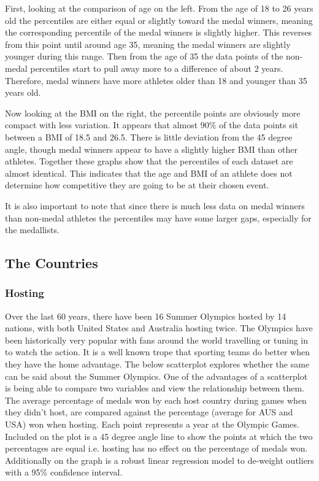 \documentclass[a4 paper, 12pt]{article}
\begin{document}
        First, looking at the comparison of age on the left. From the age of 18 to 26 years old the percentiles are either equal or slightly toward the medal winners, meaning the corresponding percentile of the medal winners is slightly higher. This reverses from this point until around age 35, meaning the medal winners are slightly younger during this range. Then from the age of 35 the data points of the non-medal percentiles start to pull away more to a difference of about 2 years. Therefore, medal winners have more athletes older than 18 and younger than 35 years old. 

        Now looking at the BMI on the right, the percentile points are obviously more compact with less variation. It appears that almost 90\% of the data points sit between a BMI of 18.5 and 26.5. There is little deviation from the 45 degree angle, though medal winners appear to have a slightly higher BMI than other athletes. Together these graphs show that the percentiles of each dataset are almost identical. This indicates that the age and BMI of an athlete does not determine how competitive they are going to be at their chosen event.

        It is also important to note that since there is much less data on medal winners than non-medal athletes the percentiles may have some larger gaps, especially for the medallists.
    
    \subsection{The Countries}

        \subsubsection{Hosting}
        Over the last 60 years, there have been 16 Summer Olympics hosted by 14 nations, with both United States and Australia hosting twice. The Olympics have been historically very popular with fans around the world travelling or tuning in to watch the action. It is a well known trope that sporting teams do better when they have the home advantage. The below scatterplot explores whether the same can be said about the Summer Olympics. One of the advantages of a scatterplot is being able to compare two variables and view the relationship between them. The average percentage of medals won by each host country during games when they didn't host, are compared against the percentage (average for AUS and USA) won when hosting. Each point represents a year at the Olympic Games. Included on the plot is a 45 degree angle line to show the points at which the two percentages are equal i.e. hosting has no effect on the percentage of medals won. Additionally on the graph is a robust linear regression model to de-weight outliers with a 95\% confidence interval. 
\end{document}
